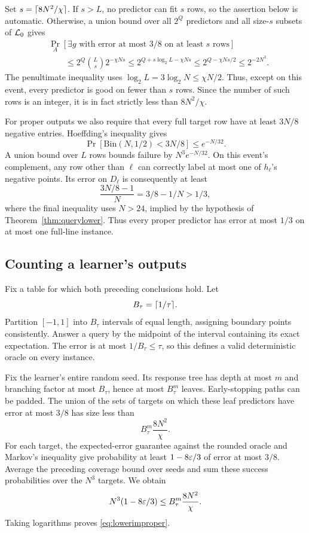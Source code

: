 Set $s=\lceil 8N^2/\chi\rceil$. If $s>L$, no predictor can fit $s$ rows, so the assertion below is automatic. Otherwise, a union bound over all $2^Q$ predictors and all size-$s$ subsets of $\mathcal L_0$ gives
\begin{align*}
 &\Pr_A[\exists g\text{ with error at most }3/8\text{ on at least }s\text{ rows}]\\
 &\hspace{2em}\le2^Q\binom Ls2^{-\chi Ns}
 \le2^{Q+s\log_2L-\chi Ns}
 \le2^{Q-\chi Ns/2}
 \le2^{-2N^3}.
\end{align*}
The penultimate inequality uses $\log_2L=3\log_2N\le\chi N/2$. Thus, except on this event, every predictor is good on fewer than $s$ rows. Since the number of such rows is an integer, it is in fact strictly less than $8N^2/\chi$.

For proper outputs we also require that every full target row have at least $3N/8$ negative entries. Hoeffding's inequality \citep{Hoeffding63} gives
\[
 \Pr[\mathrm{Bin}(N,1/2)<3N/8]\le e^{-N/32}.
\]
A union bound over $L$ rows bounds failure by $N^3e^{-N/32}$. On this event's complement, any row other than $\ell$ can correctly label at most one of $h_\ell$'s negative points. Its error on $D_\ell$ is consequently at least
\[
 \frac{3N/8-1}{N}=3/8-1/N>1/3,
\]
where the final inequality uses $N>24$, implied by the hypothesis of Theorem~\ref{thm:querylower}. Thus every proper predictor has error at most $1/3$ on at most one full-line instance.

\subsection{Counting a learner's outputs}
Fix a table for which both preceding conclusions hold. Let
\[
 B_\tau=\lceil 1/\tau\rceil.
\]
Partition $[-1,1]$ into $B_\tau$ intervals of equal length, assigning boundary points consistently. Answer a query by the midpoint of the interval containing its exact expectation. The error is at most $1/B_\tau\le\tau$, so this defines a valid deterministic oracle on every instance.

Fix the learner's entire random seed. Its response tree has depth at most $m$ and branching factor at most $B_\tau$, hence at most $B_\tau^m$ leaves. Early-stopping paths can be padded. The union of the sets of targets on which these leaf predictors have error at most $3/8$ has size less than
\[
 B_\tau^m\frac{8N^2}{\chi}.
\]
For each target, the expected-error guarantee against the rounded oracle and Markov's inequality give probability at least $1-8\varepsilon/3$ of error at most $3/8$. Average the preceding coverage bound over seeds and sum these success probabilities over the $N^3$ targets. We obtain
\[
 N^3(1-8\varepsilon/3)\le B_\tau^m\frac{8N^2}{\chi}.
\]
Taking logarithms proves \eqref{eq:lowerimproper}.

